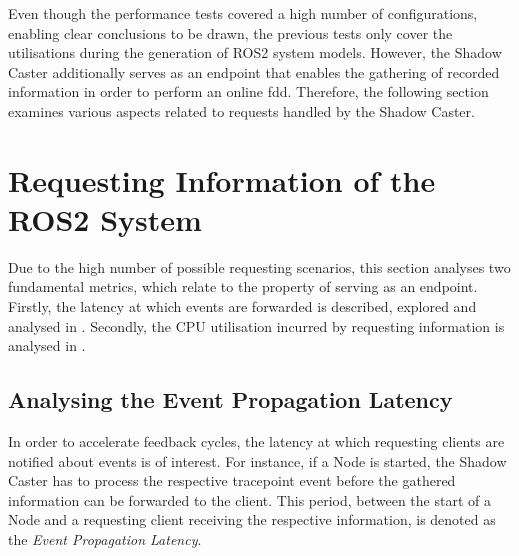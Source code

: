     Even though the performance tests covered a high number of configurations, enabling clear conclusions to be drawn, the previous tests only cover the utilisations during the generation of ROS2 system models. However, the Shadow Caster additionally serves as an endpoint that enables the gathering of recorded information in order to perform an online \acl{fdd}. Therefore, the following section examines various aspects related to requests handled by the Shadow Caster.


\section{Requesting Information of the ROS2 System} \label{sec:eval:requesting}
    Due to the high number of possible requesting scenarios, this section analyses two fundamental metrics, which relate to the property of serving as an endpoint. Firstly, the latency at which events are forwarded is described, explored and analysed in . Secondly, the CPU utilisation incurred by requesting information is analysed in .


    \subsection{Analysing the Event Propagation Latency} \label{subsec:eval:eventProbLatency}
        In order to accelerate feedback cycles, the latency at which requesting clients are notified about events is of interest. For instance, if a Node is started, the Shadow Caster has to process the respective tracepoint event before the gathered information can be forwarded to the client. This period, between the start of a Node and a requesting client receiving the respective information, is denoted as the \emph{Event Propagation Latency}.
        
